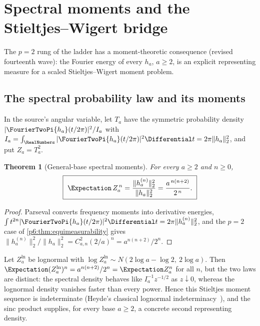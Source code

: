 \documentclass[11pt,oneside]{article}
\numberwithin{equation}{section}
\newtheorem{theorem}{Theorem}[section]
\theoremstyle{definition}
\theoremstyle{remark}
\begin{document}
\section{Spectral moments and the Stieltjes--Wigert bridge}
\label{p6:sec:spectral-sw}

The $p=2$ rung of the ladder has a moment-theoretic consequence (revised
fourteenth wave): the Fourier energy of every $h_a$, $a\ge2$, is an explicit
representing measure for a scaled Stieltjes--Wigert moment problem.

\subsection{The spectral probability law and its moments}

In the source's angular variable, let $T_a$ have the symmetric probability
density $|\FourierTwoPi{h_a}(t/2\pi)|^2/I_a$ with
$I_a=\int_\RealNumbers|\FourierTwoPi{h_a}(t/2\pi)|^2\Differential t=2\pi\|h_a\|_2^2$, and put
$Z_a=T_a^2$.

\begin{theorem}[General-base spectral moments]\label{p6:thm:spectral-moments}
For every $a\ge2$ and $n\ge0$,
\begin{equation}\label{p6:eq:spectral-moments}
 \boxed{\ \Expectation\,Z_a^{\,n}
 =\frac{\|h_a^{(n)}\|_2^2}{\|h_a\|_2^2}
 =\frac{a^{\,n(n+2)}}{2^{\,n}}.\ }
\end{equation}
\end{theorem}

\begin{proof}
Parseval converts frequency moments into derivative energies,
$\int t^{2n}|\FourierTwoPi{h_a}(t/2\pi)|^2\Differential t=2\pi\|h_a^{(n)}\|_2^2$, and the
$p=2$ case of \cref{p6:thm:equimeasurability} gives
$\|h_a^{(n)}\|_2^2/\|h_a\|_2^2
=C_{a,n}^2(2/a)^n=a^{n(n+2)}/2^n$.
\end{proof}

\begin{corollary}
\label{p6:cor:lognormal-twins}
Let $Z_a^{\mathrm{ln}}$ be lognormal with
$\log Z_a^{\mathrm{ln}}\sim N(2\log a-\log2,\ 2\log a)$.  Then
$\Expectation(Z_a^{\mathrm{ln}})^n=a^{n(n+2)}/2^n=\Expectation Z_a^n$ for all $n$, but the two
laws are distinct: the spectral density behaves like $I_a^{-1}z^{-1/2}$ as
$z\downarrow0$, whereas the lognormal density vanishes faster than every
power.  Hence this Stieltjes moment sequence is indeterminate
(Heyde's classical lognormal indeterminacy~\cite{p6:heyde}), and the sinc
product supplies, for every base $a\ge2$, a concrete second representing
density.
\end{corollary}
\end{document}
